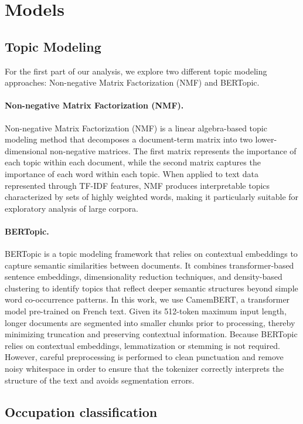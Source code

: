 \documentclass{article}
\begin{document}
\section{Models}


\subsection{Topic Modeling}

For the first part of our analysis, we explore two different topic modeling approaches: Non-negative Matrix Factorization (NMF) and BERTopic.

\paragraph{Non-negative Matrix Factorization (NMF).}
Non-negative Matrix Factorization (NMF) is a linear algebra-based topic modeling method that decomposes a document-term matrix into two lower-dimensional non-negative matrices. The first matrix represents the importance of each topic within each document, while the second matrix captures the importance of each word within each topic. When applied to text data represented through TF-IDF features, NMF produces interpretable topics characterized by sets of highly weighted words, making it particularly suitable for exploratory analysis of large corpora.

\paragraph{BERTopic.}
BERTopic is a topic modeling framework that relies on contextual embeddings to capture semantic similarities between documents. It combines transformer-based sentence embeddings, dimensionality reduction techniques, and density-based clustering to identify topics that reflect deeper semantic structures beyond simple word co-occurrence patterns. In this work, we use CamemBERT, a transformer model pre-trained on French text. Given its 512-token maximum input length, longer documents are segmented into smaller chunks prior to processing, thereby minimizing truncation and preserving contextual information. Because BERTopic relies on contextual embeddings, lemmatization or stemming is not required. However, careful preprocessing is performed to clean punctuation and remove noisy whitespace in order to ensure that the tokenizer correctly interprets the structure of the text and avoids segmentation errors.

\subsection{Occupation classification}
\end{document}
